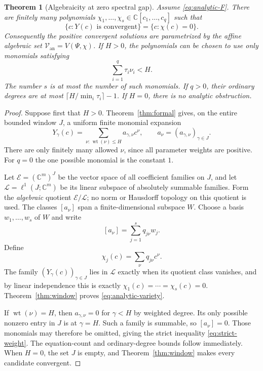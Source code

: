 \documentclass[11pt,a4paper]{article}
\numberwithin{equation}{section}
\newtheorem{theorem}{Theorem}[section]
\theoremstyle{definition}
\theoremstyle{remark}
\newcommand{\C}{\mathbb C}
\newcommand{\cV}{\mathcal V}
\newcommand{\wt}{\operatorname{wt}}
\begin{document}
\begin{theorem}[Algebraicity at zero spectral gap]
\label{thm:algebraic}
Assume \eqref{eq:analytic-F}. There are finitely many polynomials
$\chi_1,\ldots,\chi_s\in\C[c_1,\ldots,c_q]$ such that
\begin{equation}\label{eq:analytic-variety}
 \{c:Y(c)\text{ is convergent}\}=\{c:\chi(c)=0\}.
\end{equation}
Consequently the positive convergent solutions are parametrized by the
affine algebraic set $\cV_{\mathrm{an}}=V(\Psi,\chi)$.
If $H>0$, the polynomials can be chosen to use only monomials satisfying
\begin{equation}\label{eq:strict-weight}
 \sum_{i=1}^q\tau_i\nu_i<H.
\end{equation}
The number $s$ is at most the number of such monomials. If $q>0$, their
ordinary degrees are at most $\lceil H/\min_i\tau_i\rceil-1$.
If $H=0$, there is no analytic obstruction.
\end{theorem}
\begin{proof}
Suppose first that $H>0$. Theorem~\ref{thm:formal} gives, on the entire
bounded window $J$, a uniform finite monomial expansion
\begin{equation}\label{eq:finite-monomials}
 Y_\gamma(c)=\sum_{\nu:\,\wt(\nu)\leq H} a_{\gamma,\nu}c^\nu,
 \qquad a_\nu=(a_{\gamma,\nu})_{\gamma\in J}.
\end{equation}
There are only finitely many allowed $\nu$, since all parameter weights
are positive. For $q=0$ the one possible monomial is the constant $1$.

Let $\mathcal E=(\C^m)^J$ be the vector space of all coefficient families
on $J$, and let $\mathcal L=\ell^1(J;\C^m)$ be its linear subspace of
absolutely summable families. Form the \emph{algebraic} quotient
$\mathcal E/\mathcal L$; no norm or Hausdorff topology on this quotient
is used. The classes $[a_\nu]$ span a finite-dimensional subspace $W$.
Choose a basis $w_1,\ldots,w_s$ of $W$ and write
\[
 [a_\nu]=\sum_{j=1}^s q_{j\nu}w_j.
\]
Define
\begin{equation}\label{eq:chi}
 \chi_j(c)=\sum_{\nu}q_{j\nu}c^\nu.
\end{equation}
The family $(Y_\gamma(c))_{\gamma\in J}$ lies in $\mathcal L$ exactly
when its quotient class vanishes, and by linear independence this is
exactly $\chi_1(c)=\cdots=\chi_s(c)=0$.
Theorem~\ref{thm:window} proves \eqref{eq:analytic-variety}.

If $\wt(\nu)=H$, then $a_{\gamma,\nu}=0$ for $\gamma<H$ by weighted
degree. Its only possible nonzero entry in $J$ is at $\gamma=H$.
Such a family is summable, so $[a_\nu]=0$. Those monomials may therefore
be omitted, giving the strict inequality \eqref{eq:strict-weight}.
The equation-count and ordinary-degree bounds follow immediately.
When $H=0$, the set $J$ is empty, and Theorem~\ref{thm:window} makes every
candidate convergent.
\end{proof}
\end{document}
